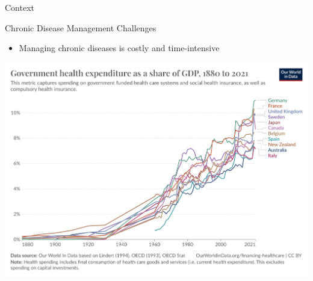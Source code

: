 \documentclass[handout]{beamer}\mode<handout>{\usetheme{AMSBolognaFC}}
\begin{document}
\begin{frame}[c]{Context}
    
    Chronic Disease Management Challenges
    \vfill
    \begin{itemize}
        \item Managing chronic diseases is \alert{costly} and \alert{time-intensive}
    \end{itemize}
    \vfill
    \centering
    \includegraphics[width=.6\textwidth]{figures/public-health-expenditure-share-gdp}
    \vfill

\end{frame}
\end{document}
